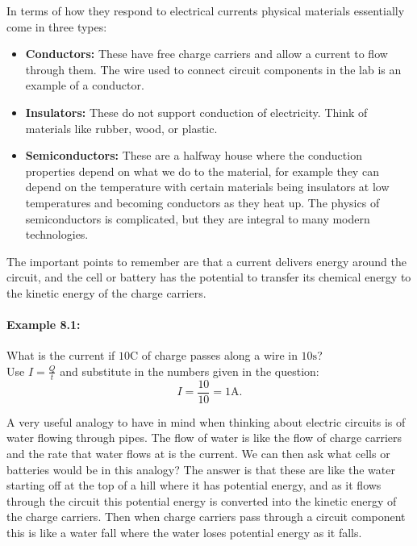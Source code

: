 In terms of how they respond to electrical currents physical materials essentially come in three types:
\begin{itemize}
\setlength{\itemsep}{-5pt}
    \item \textbf{Conductors:} These have free charge carriers and allow a current to flow through them. The wire used to connect circuit components in the lab is an example of a conductor.
    \item \textbf{Insulators:} These do not support conduction of electricity. Think of materials like rubber, wood, or plastic.
    \item \textbf{Semiconductors:} These are a halfway house where the conduction properties depend on what we do to the material, for example they can depend on the temperature with certain materials being insulators at low temperatures and becoming conductors as they heat up. The physics of semiconductors is complicated, but they are integral to many modern technologies.
\end{itemize}  

The important points to remember are that a current delivers energy around the circuit, and the cell or battery has the potential to transfer its chemical energy to the kinetic energy of the charge carriers.

\paragraph{Example 8.1:}What is the current if $10\text{C}$ of charge passes along a wire in $10\text{s}$?\\

Use $I=\frac{Q}{t}$ and substitute in the numbers given in the question:
\begin{equation*}
I=\frac{10}{10}=1\text{A}.
\end{equation*}

A very useful analogy to have in mind when thinking about electric circuits is of water flowing through pipes. The flow of water is like the flow of charge carriers and the rate that water flows at is the current.  We can then ask what cells or batteries would be in this analogy? The answer is that these are like the water starting off at the top of a hill where it has potential energy, and as it flows through the circuit this potential energy is converted into the kinetic energy of the charge carriers. Then when charge carriers pass through a circuit component this is like a water fall where the water loses potential energy as it falls.\\


